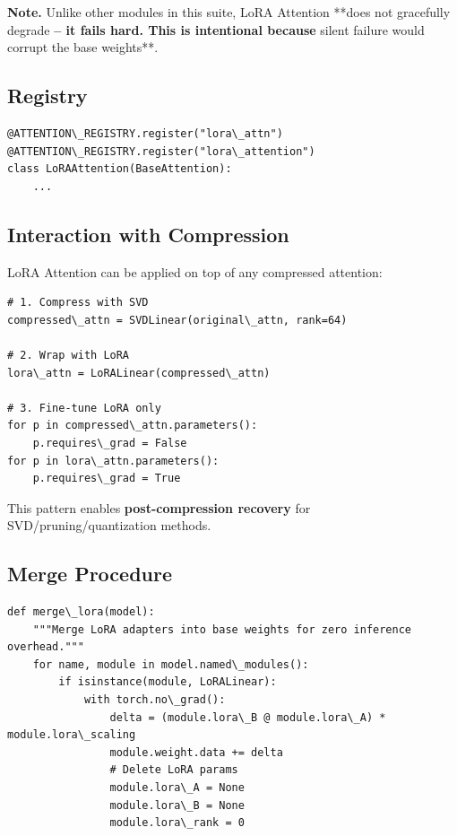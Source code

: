 \textbf{Note.} Unlike other modules in this suite, LoRA Attention **does not 
gracefully degrade\textbf{ -- it fails hard. This is intentional because }silent 
failure would corrupt the base weights**.

\subsection{Registry}

\begin{lstlisting}
@ATTENTION\_REGISTRY.register("lora\_attn")
@ATTENTION\_REGISTRY.register("lora\_attention")
class LoRAAttention(BaseAttention):
    ...
\end{lstlisting}

\subsection{Interaction with Compression}

LoRA Attention can be applied on top of any compressed attention:

\begin{lstlisting}
# 1. Compress with SVD
compressed\_attn = SVDLinear(original\_attn, rank=64)

# 2. Wrap with LoRA
lora\_attn = LoRALinear(compressed\_attn)

# 3. Fine-tune LoRA only
for p in compressed\_attn.parameters():
    p.requires\_grad = False
for p in lora\_attn.parameters():
    p.requires\_grad = True
\end{lstlisting}

This pattern enables \textbf{post-compression recovery} for SVD/pruning/quantization 
methods.

\subsection{Merge Procedure}

\begin{lstlisting}
def merge\_lora(model):
    """Merge LoRA adapters into base weights for zero inference overhead."""
    for name, module in model.named\_modules():
        if isinstance(module, LoRALinear):
            with torch.no\_grad():
                delta = (module.lora\_B @ module.lora\_A) * module.lora\_scaling
                module.weight.data += delta
                # Delete LoRA params
                module.lora\_A = None
                module.lora\_B = None
                module.lora\_rank = 0
\end{lstlisting}

